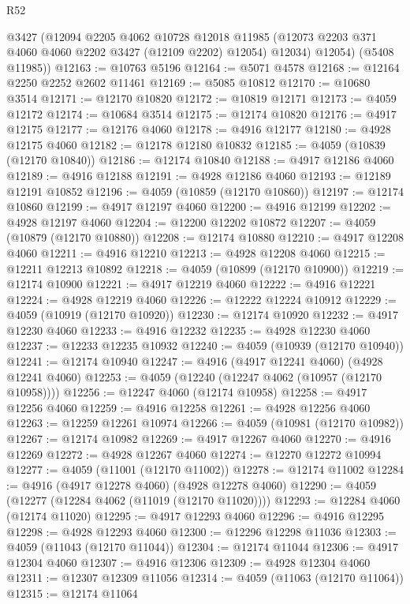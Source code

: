 \begin{lexlean}{R52}
\begin{coremodule}
        @3427
        (@12094
          @2205
          @4062
          @10728
          @12018
          @11985
          (@12073 @2203 @371 @4060 @4060 @2202 @3427 (@12109 @2202) @12054)
          @12034)
        @12054)
      (@5408 @11985))
@12163 := @10763 @5196
@12164 := @5071 @4578
@12168 := @12164 @2250 @2252 @2602 @11461
@12169 := @5085 @10812
@12170 := @10680 @3514
@12171 := @12170 @10820
@12172 := @10819 @12171
@12173 := @4059 @12172
@12174 := @10684 @3514
@12175 := @12174 @10820
@12176 := @4917 @12175
@12177 := @12176 @4060
@12178 := @4916 @12177
@12180 := @4928 @12175 @4060
@12182 := @12178 @12180 @10832
@12185 := @4059 (@10839 (@12170 @10840))
@12186 := @12174 @10840
@12188 := @4917 @12186 @4060
@12189 := @4916 @12188
@12191 := @4928 @12186 @4060
@12193 := @12189 @12191 @10852
@12196 := @4059 (@10859 (@12170 @10860))
@12197 := @12174 @10860
@12199 := @4917 @12197 @4060
@12200 := @4916 @12199
@12202 := @4928 @12197 @4060
@12204 := @12200 @12202 @10872
@12207 := @4059 (@10879 (@12170 @10880))
@12208 := @12174 @10880
@12210 := @4917 @12208 @4060
@12211 := @4916 @12210
@12213 := @4928 @12208 @4060
@12215 := @12211 @12213 @10892
@12218 := @4059 (@10899 (@12170 @10900))
@12219 := @12174 @10900
@12221 := @4917 @12219 @4060
@12222 := @4916 @12221
@12224 := @4928 @12219 @4060
@12226 := @12222 @12224 @10912
@12229 := @4059 (@10919 (@12170 @10920))
@12230 := @12174 @10920
@12232 := @4917 @12230 @4060
@12233 := @4916 @12232
@12235 := @4928 @12230 @4060
@12237 := @12233 @12235 @10932
@12240 := @4059 (@10939 (@12170 @10940))
@12241 := @12174 @10940
@12247 := @4916 (@4917 @12241 @4060) (@4928 @12241 @4060)
@12253 := @4059 (@12240 (@12247 @4062 (@10957 (@12170 @10958))))
@12256 := @12247 @4060 (@12174 @10958)
@12258 := @4917 @12256 @4060
@12259 := @4916 @12258
@12261 := @4928 @12256 @4060
@12263 := @12259 @12261 @10974
@12266 := @4059 (@10981 (@12170 @10982))
@12267 := @12174 @10982
@12269 := @4917 @12267 @4060
@12270 := @4916 @12269
@12272 := @4928 @12267 @4060
@12274 := @12270 @12272 @10994
@12277 := @4059 (@11001 (@12170 @11002))
@12278 := @12174 @11002
@12284 := @4916 (@4917 @12278 @4060) (@4928 @12278 @4060)
@12290 := @4059 (@12277 (@12284 @4062 (@11019 (@12170 @11020))))
@12293 := @12284 @4060 (@12174 @11020)
@12295 := @4917 @12293 @4060
@12296 := @4916 @12295
@12298 := @4928 @12293 @4060
@12300 := @12296 @12298 @11036
@12303 := @4059 (@11043 (@12170 @11044))
@12304 := @12174 @11044
@12306 := @4917 @12304 @4060
@12307 := @4916 @12306
@12309 := @4928 @12304 @4060
@12311 := @12307 @12309 @11056
@12314 := @4059 (@11063 (@12170 @11064))
@12315 := @12174 @11064

\end{coremodule}
\end{lexlean}
